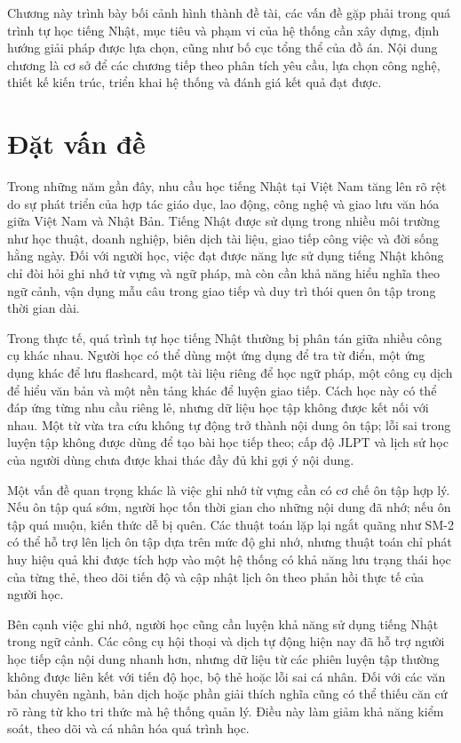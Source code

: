 \documentclass[../DoAn.tex]{subfiles}
\begin{document}
Chương này trình bày bối cảnh hình thành đề tài, các vấn đề gặp phải trong quá trình tự học tiếng Nhật, mục tiêu và phạm vi của hệ thống cần xây dựng, định hướng giải pháp được lựa chọn, cũng như bố cục tổng thể của đồ án. Nội dung chương là cơ sở để các chương tiếp theo phân tích yêu cầu, lựa chọn công nghệ, thiết kế kiến trúc, triển khai hệ thống và đánh giá kết quả đạt được.

\section{Đặt vấn đề}
\label{section:1.1}

Trong những năm gần đây, nhu cầu học tiếng Nhật tại Việt Nam tăng lên rõ rệt do sự phát triển của hợp tác giáo dục, lao động, công nghệ và giao lưu văn hóa giữa Việt Nam và Nhật Bản. Tiếng Nhật được sử dụng trong nhiều môi trường như học thuật, doanh nghiệp, biên dịch tài liệu, giao tiếp công việc và đời sống hằng ngày. Đối với người học, việc đạt được năng lực sử dụng tiếng Nhật không chỉ đòi hỏi ghi nhớ từ vựng và ngữ pháp, mà còn cần khả năng hiểu nghĩa theo ngữ cảnh, vận dụng mẫu câu trong giao tiếp và duy trì thói quen ôn tập trong thời gian dài.

Trong thực tế, quá trình tự học tiếng Nhật thường bị phân tán giữa nhiều công cụ khác nhau. Người học có thể dùng một ứng dụng để tra từ điển, một ứng dụng khác để lưu flashcard, một tài liệu riêng để học ngữ pháp, một công cụ dịch để hiểu văn bản và một nền tảng khác để luyện giao tiếp. Cách học này có thể đáp ứng từng nhu cầu riêng lẻ, nhưng dữ liệu học tập không được kết nối với nhau. Một từ vừa tra cứu không tự động trở thành nội dung ôn tập; lỗi sai trong luyện tập không được dùng để tạo bài học tiếp theo; cấp độ JLPT và lịch sử học của người dùng chưa được khai thác đầy đủ khi gợi ý nội dung.

Một vấn đề quan trọng khác là việc ghi nhớ từ vựng cần có cơ chế ôn tập hợp lý. Nếu ôn tập quá sớm, người học tốn thời gian cho những nội dung đã nhớ; nếu ôn tập quá muộn, kiến thức dễ bị quên. Các thuật toán lặp lại ngắt quãng như SM-2 có thể hỗ trợ lên lịch ôn tập dựa trên mức độ ghi nhớ, nhưng thuật toán chỉ phát huy hiệu quả khi được tích hợp vào một hệ thống có khả năng lưu trạng thái học của từng thẻ, theo dõi tiến độ và cập nhật lịch ôn theo phản hồi thực tế của người học.

Bên cạnh việc ghi nhớ, người học cũng cần luyện khả năng sử dụng tiếng Nhật trong ngữ cảnh. Các công cụ hội thoại và dịch tự động hiện nay đã hỗ trợ người học tiếp cận nội dung nhanh hơn, nhưng dữ liệu từ các phiên luyện tập thường không được liên kết với tiến độ học, bộ thẻ hoặc lỗi sai cá nhân. Đối với các văn bản chuyên ngành, bản dịch hoặc phần giải thích nghĩa cũng có thể thiếu căn cứ rõ ràng từ kho tri thức mà hệ thống quản lý. Điều này làm giảm khả năng kiểm soát, theo dõi và cá nhân hóa quá trình học.
\end{document}

